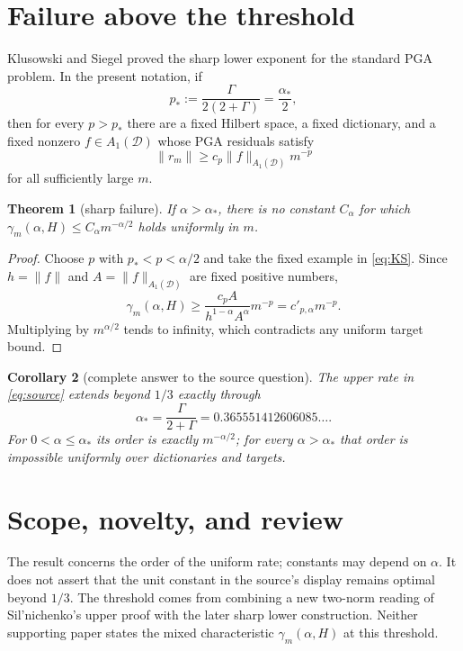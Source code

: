 \documentclass[11pt]{article}
\newtheorem{theorem}{Theorem}
\newtheorem{corollary}[theorem]{Corollary}
\newcommand{\D}{\mathcal D}
\newcommand{\Aone}{A_1(\mathcal D)}
\begin{document}
\section{Failure above the threshold}

Klusowski and Siegel \cite{KlusowskiSiegel2025} proved the sharp lower
exponent for the standard PGA problem.  In the present notation, if
\[
 p_*:=\frac{\Gamma}{2(2+\Gamma)}=\frac{\alpha_*}{2},
\]
then for every $p>p_*$ there are a fixed Hilbert space, a fixed dictionary,
and a fixed nonzero $f\in A_1(\D)$ whose PGA residuals satisfy
\begin{equation}\label{eq:KS}
 \|r_m\|\geq c_p\|f\|_{\Aone}m^{-p}
\end{equation}
for all sufficiently large $m$.

\begin{theorem}[sharp failure]\label{thm:failure}
If $\alpha>\alpha_*$, there is no constant $C_\alpha$ for which
$\gamma_m(\alpha,H)\leq C_\alpha m^{-\alpha/2}$ holds uniformly in $m$.
\end{theorem}

\begin{proof}
Choose $p$ with $p_*<p<\alpha/2$ and take the fixed example in
\eqref{eq:KS}.  Since $h=\|f\|$ and $A=\|f\|_{\Aone}$ are fixed positive
numbers,
\[
 \gamma_m(\alpha,H)
 \geq \frac{c_pA}{h^{1-\alpha}A^\alpha}m^{-p}
 =c'_{p,\alpha}m^{-p}.
\]
Multiplying by $m^{\alpha/2}$ tends to infinity, which contradicts any
uniform target bound.
\end{proof}

\begin{corollary}[complete answer to the source question]
The upper rate in \eqref{eq:source} extends beyond $1/3$ exactly through
\[
 \alpha_*=\frac{\Gamma}{2+\Gamma}
       =0.365551412606085\ldots .
\]
For $0<\alpha\leq\alpha_*$ its order is exactly $m^{-\alpha/2}$; for every
$\alpha>\alpha_*$ that order is impossible uniformly over dictionaries and
targets.
\end{corollary}

\section{Scope, novelty, and review}

The result concerns the order of the uniform rate; constants may depend on
$\alpha$.  It does not assert that the unit constant in the source's display
remains optimal beyond $1/3$.  The threshold comes from combining a new
two-norm reading of Sil'nichenko's upper proof with the later sharp lower
construction.  Neither supporting paper states the mixed characteristic
$\gamma_m(\alpha,H)$ at this threshold.
\end{document}
